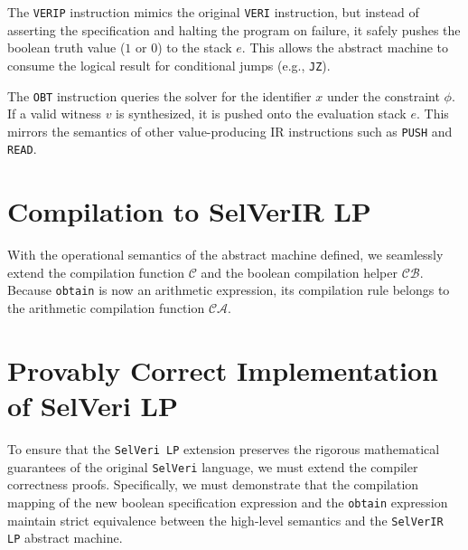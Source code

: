 \documentclass{article}
\begin{document}
The \texttt{VERIP} instruction mimics the original \texttt{VERI} instruction, but instead of asserting the specification and halting the program on failure, it safely pushes the boolean truth value ($1$ or $0$) to the stack $e$. This allows the abstract machine to consume the logical result for conditional jumps (e.g., \texttt{JZ}).

The \texttt{OBT} instruction queries the solver for the identifier $x$ under the constraint $\phi$. If a valid witness $v$ is synthesized, it is pushed onto the evaluation stack $e$. This mirrors the semantics of other value-producing IR instructions such as \texttt{PUSH} and \texttt{READ}.

\section{Compilation to SelVerIR LP}

With the operational semantics of the abstract machine defined, we seamlessly extend the compilation function $\mathcal{C}$ and the boolean compilation helper $\mathcal{CB}$. Because \texttt{obtain} is now an arithmetic expression, its compilation rule belongs to the arithmetic compilation function $\mathcal{CA}$.

\begin{table}[h!]
\centering
\renewcommand{\arraystretch}{1.8} 
\caption{Compilation rules for SelVeri LP extensions}
\end{table}

\newpage
\section{Provably Correct Implementation of SelVeri LP}

To ensure that the \texttt{SelVeri LP} extension preserves the rigorous mathematical guarantees of the original \texttt{SelVeri} language, we must extend the compiler correctness proofs. Specifically, we must demonstrate that the compilation mapping of the new boolean specification expression and the \texttt{obtain} expression maintain strict equivalence between the high-level semantics and the \texttt{SelVerIR LP} abstract machine.
\end{document}
